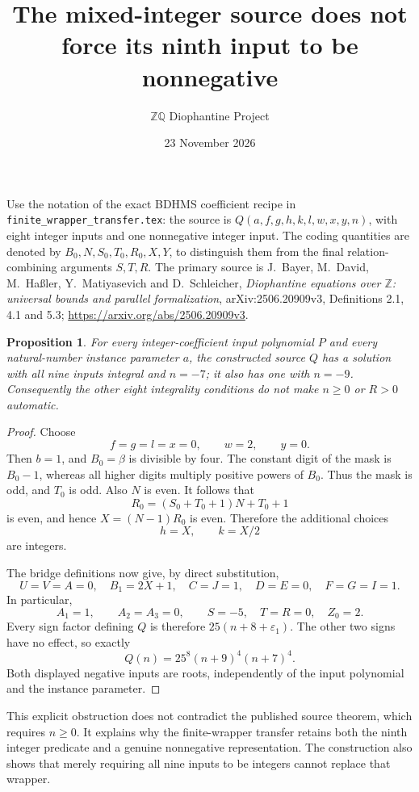 \documentclass[11pt]{article}
\title{The mixed-integer source does not force its ninth input to be nonnegative}
\author{\(\mathbb Z\mathbb Q\) Diophantine Project}
\date{23 November 2026}
\newtheorem{proposition}{Proposition}
\begin{document}
\maketitle

Use the notation of the exact BDHMS coefficient recipe in
\texttt{finite\_wrapper\_transfer.tex}: the source is
\(Q(a,f,g,h,k,l,w,x,y,n)\), with eight integer inputs and one
nonnegative integer input.  The coding quantities are denoted by
\(B_0,N,S_0,T_0,R_0,X,Y\), to distinguish them from the final
relation-combining arguments \(S,T,R\).
The primary source is J.~Bayer, M.~David, M.~Ha{\ss}ler,
Y.~Matiyasevich and D.~Schleicher, \emph{Diophantine equations over
\(\mathbb Z\): universal bounds and parallel formalization},
arXiv:2506.20909v3, Definitions 2.1, 4.1 and 5.3;
\url{https://arxiv.org/abs/2506.20909v3}.

\begin{proposition}
For every integer-coefficient input polynomial \(P\) and every
natural-number instance parameter \(a\), the constructed source
\(Q\) has a solution with all nine inputs integral and \(n=-7\);
it also has one with \(n=-9\).  Consequently the other eight
integrality conditions do not make \(n\ge0\) or \(R>0\) automatic.
\end{proposition}
\begin{proof}
Choose
\[
                f=g=l=x=0,\qquad w=2,\qquad y=0.
\]
Then \(b=1\), and \(B_0=\beta\) is divisible by four.
The constant digit of the mask is \(B_0-1\), whereas all higher
digits multiply positive powers of \(B_0\).  Thus the mask is odd,
and \(T_0\) is odd.  Also \(N\) is even.  It follows that
\[
 R_0=(S_0+T_0+1)N+T_0+1
\]
is even, and hence \(X=(N-1)R_0\) is even.  Therefore the
additional choices
\[
                         h=X,\qquad k=X/2
\]
are integers.

The bridge definitions now give, by direct substitution,
\[
 U=V=A=0,\quad B_1=2X+1,\quad C=J=1,\quad D=E=0,
 \quad F=G=I=1.
\]
In particular,
\[
        A_1=1,\qquad A_2=A_3=0,\qquad
        S=-5,\quad T=R=0,\quad Z_0=2.
\]
Every sign factor defining \(Q\) is therefore
\(25(n+8+\varepsilon_1)\).  The other two signs have no
effect, so exactly
\[
                     Q(n)=25^8(n+9)^4(n+7)^4.
\]
Both displayed negative inputs are roots, independently of the
input polynomial and the instance parameter.
\end{proof}

This explicit obstruction does not contradict the published source
theorem, which requires \(n\ge0\).  It explains why the finite-wrapper
transfer retains both the ninth integer predicate and a genuine
nonnegative representation.  The construction also shows that merely
requiring all nine inputs to be integers cannot replace that wrapper.
\end{document}
